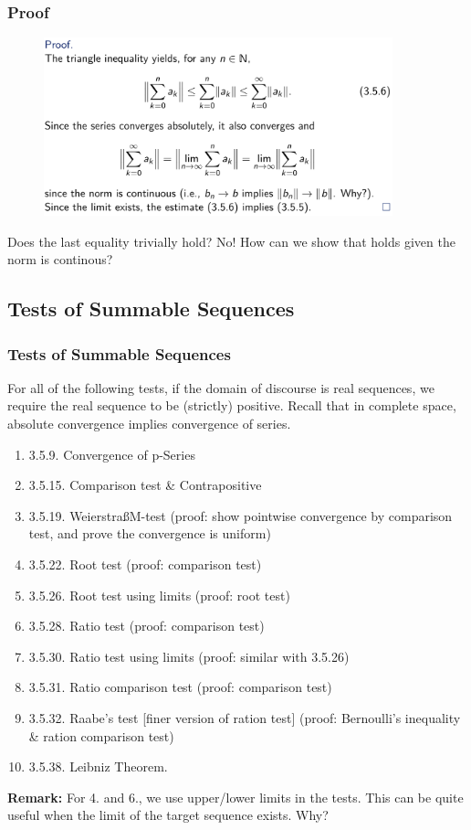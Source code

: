 \documentclass[10pt, t]{beamer}
\begin{document}
\begin{frame}
    \frametitle{Proof}

    \begin{figure}[H]
        \centering
        \includegraphics[width=0.9\textwidth]{2020-11-11-14-43-22.png}
    \end{figure}
    Does the last equality trivially hold? No! How can we show that holds given the norm is continous?
\end{frame}

\subsection{Tests of Summable Sequences}
\begin{frame}
    \frametitle{Tests of Summable Sequences}

    For all of the following tests, if the domain of discourse is real sequences, we require the real sequence to be (strictly) positive. Recall that in complete space, absolute convergence implies convergence of series.
    \begin{enumerate}
        \item 3.5.9. Convergence of p-Series
        \item 3.5.15. Comparison test \& Contrapositive
        \item 3.5.19. Weierstra\ss M-test (proof: show pointwise convergence by comparison test, and prove the convergence is uniform)
        \item 3.5.22. Root test (proof: comparison test)
        \item 3.5.26. Root test using limits (proof: root test)
        \item 3.5.28. Ratio test (proof: comparison test)
        \item 3.5.30. Ratio test using limits (proof: similar with 3.5.26)
        \item 3.5.31. Ratio comparison test (proof: comparison test)
        \item 3.5.32. Raabe's test [finer version of ration test] (proof: Bernoulli's inequality \& ration comparison test)
        \item 3.5.38. Leibniz Theorem.
    \end{enumerate}
    \textbf{Remark:} For 4. and 6., we use upper/lower limits in the tests. This can be quite useful when the limit of the target sequence exists. Why?
\end{frame}
\end{document}
